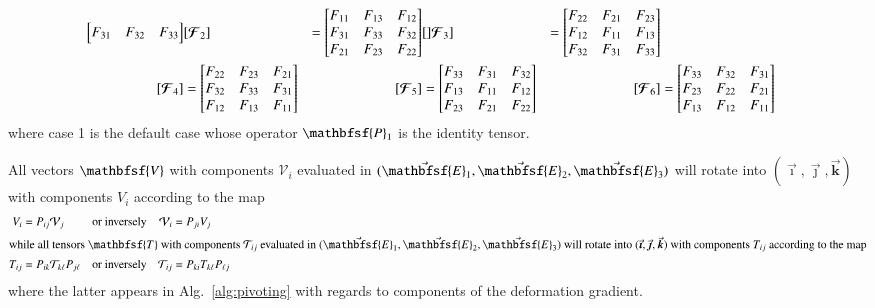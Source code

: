 \begin{subequations}
\begin{align}
\begin{bmatrix}
    F_{31} & F_{32} & F_{33}
    \end{bmatrix} & 
    [ \boldsymbol{\mathcal{F}}_2 ] & = \begin{bmatrix}
    F_{11} & F_{13} & F_{12}\\
    F_{31} & F_{33} & F_{32}\\
    F_{21} & F_{23} & F_{22}
    \end{bmatrix} &
    [ ]\boldsymbol{\mathcal{F}}_3 ] & = \begin{bmatrix}
    F_{22} & F_{21} & F_{23}\\
    F_{12} & F_{11} & F_{13}\\
    F_{32} & F_{31} & F_{33}
    \end{bmatrix} \notag \\
    [ \boldsymbol{\mathcal{F}}_4 ] & = \begin{bmatrix}
    F_{22} & F_{23} & F_{21}\\
    F_{32} & F_{33} & F_{31}\\
    F_{12} & F_{13} & F_{11}
    \end{bmatrix} &
    [ \boldsymbol{\mathcal{F}}_5 ] & = \begin{bmatrix}
    F_{33} & F_{31} & F_{32}\\
    F_{13} & F_{11} & F_{12}\\
    F_{23} & F_{21} & F_{22}
    \end{bmatrix} & 
    [ \boldsymbol{\mathcal{F}}_6 ] & = \begin{bmatrix}
    F_{33} & F_{32} & F_{31}\\
    F_{23} & F_{22} & F_{21}\\
    F_{13} & F_{12} & F_{11}
    \end{bmatrix}
    \end{align}
\end{subequations}
where case 1 is the default case whose operator $\mathbfsf{P}_1$ is the identity tensor.

All vectors $\mathbfsf{V}$ with components $\mathcal{V}_i$ evaluated in $( \vec{\mathbfsf{E}}_1 , \vec{\mathbfsf{E}}_2 , \vec{\mathbfsf{E}}_3 )$ will rotate into $( \vec{\boldsymbol{\imath}} , \vec{\boldsymbol{\jmath}} , \vec{\boldsymbol{k}} )$ with components $V_i$ according to the map
\begin{subequations}
    \begin{align}
    V_i & = P_{ij} \mathcal{V}_j & \text{or inversely} & &
    \mathcal{V}_i & = P_{ji} V_j \\
    \intertext{while all tensors $\mathbfsf{T}$ with components $\mathcal{T}_{ij}$ evaluated in $( \vec{\mathbfsf{E}}_1 , \vec{\mathbfsf{E}}_2 , \vec{\mathbfsf{E}}_3 )$ will rotate into $( \vec{\boldsymbol{\imath}} , \vec{\boldsymbol{\jmath}} , \vec{\boldsymbol{k}} )$ with components $T_{ij}$ according to the map}
    T_{ij} & = P_{ik} \mathcal{T}_{k\ell} P_{j\ell} & \text{or inversely} & &
    \mathcal{T}_{ij} & = P_{ki} T_{k\ell} P_{\ell j}
    \end{align}
\end{subequations}
where the latter appears in Alg.~\ref{alg:pivoting} with regards to components of the deformation gradient.

